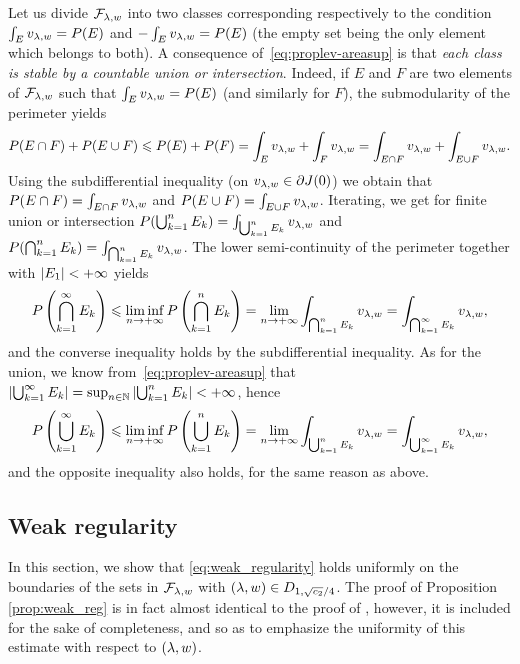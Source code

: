 \begin{rem}\label{rem:countunion}
  Let us divide $\mathcal{F}_{\lambda,w}$ into two classes corresponding respectively to the condition $\int_E v_{\lambda,w} =P(E)$ and $-\int_E v_{\lambda,w} =P(E)$ (the empty set being the only element which belongs to both). A consequence of~\eqref{eq:proplev-areasup} is that \textit{each class is stable by a countable union or intersection}.
Indeed, if $E$ and $F$ are two elements of $\mathcal{F}_{\lambda,w}$ such that $\int_Ev_{\lambda,w}=P(E)$ (and similarly for $F$), the submodularity of the perimeter yields
\begin{equation*}
  P(E\cap F)+P(E\cup F)\leqslant P(E)+P(F) = \int_E v_{\lambda,w} +\int_F v_{\lambda,w} = \int_{E\cap F} v_{\lambda,w} + \int_{E\cup F}v_{\lambda,w}.
\end{equation*}
Using the subdifferential inequality (on $v_{\lambda,w}\in\partial J(0)$) we obtain that $P(E\cap F)= \int_{E\cap F}v_{\lambda,w}$ and $P(E\cup F)= \int_{E\cup F}v_{\lambda,w}$.
Iterating, we get for finite union or intersection $P(\bigcup_{k=1}^{n}E_k)= \int_{\bigcup_{k=1}^{n}E_k}v_{\lambda,w}$ and $P(\bigcap_{k=1}^{n}E_k)= \int_{\bigcap_{k=1}^{n}E_k}v_{\lambda,w}$. The lower semi-continuity of the perimeter together with $\left| E_1 \right|<+\infty$ yields
\begin{equation*}
  P\left(\bigcap_{k=1}^{\infty}E_k\right)\leqslant \liminf_{n\to+\infty} P\left(\bigcap_{k=1}^{n}E_k\right)=\lim_{n\to+\infty} \int_{\bigcap_{k=1}^{n}E_k}v_{\lambda,w} =\int_{\bigcap_{k=1}^{\infty}E_k}v_{\lambda,w},
\end{equation*}
and the converse inequality holds by the subdifferential inequality. As for the union, we know from~\eqref{eq:proplev-areasup} that $\left| \bigcup_{k=1}^{\infty}E_k \right|=\sup_{n\in\mathbb{N}} \left| \bigcup_{k=1}^{n}E_k \right|<+\infty$, hence
\begin{equation*}
  P\left(\bigcup_{k=1}^{\infty}E_k\right)\leqslant \liminf_{n\to+\infty} P\left(\bigcup_{k=1}^{n}E_k\right)=\lim_{n\to+\infty} \int_{\bigcup_{k=1}^{n}E_k}v_{\lambda,w} =\int_{\bigcup_{k=1}^{\infty}E_k}v_{\lambda,w},
\end{equation*}
and the opposite inequality also holds, for the same reason as above.
\end{rem}

\subsection{Weak regularity}\label{sec:props_weak_reg}


In this section, we show that \eqref{eq:weak_regularity} holds uniformly on the boundaries of the  sets in $\mathcal{F}_{\lambda,w}$ with $(\lambda,w)\in D_{1,\sqrt{c_2}/4}$. The proof of Proposition \ref{prop:weak_reg} is in fact almost identical to the proof of  \cite[Lem.~1.2]{gonzales1993boundaries}, however, it is included for the sake of completeness, and so as to emphasize the uniformity of this estimate with respect to $(\lambda,w)$.



